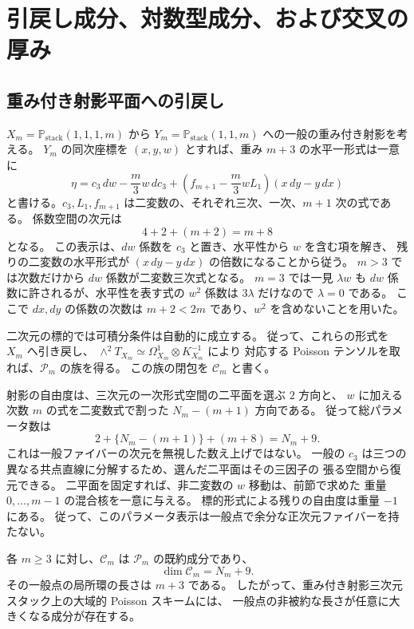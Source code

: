 \section{引戻し成分、対数型成分、および交叉の厚み}
\label{sec:allm-geometry-v33}

\subsection{重み付き射影平面への引戻し}

$X_m=\mathbb P_{\mathrm{stack}}(1,1,1,m)$ から
$Y_m=\mathbb P_{\mathrm{stack}}(1,1,m)$ への一般の重み付き射影を考える。
$Y_m$ の同次座標を $(x,y,w)$ とすれば、重み $m+3$ の水平一形式は一意に
\[
 \eta=c_3\,dw-\frac m3w\,dc_3
       +\left(f_{m+1}-\frac m3wL_1\right)(x\,dy-y\,dx)
\]
と書ける。$c_3,L_1,f_{m+1}$ は二変数の、それぞれ三次、一次、$m+1$ 次の式である。
係数空間の次元は
\[
 4+2+(m+2)=m+8
\]
となる。
この表示は、$dw$ 係数を $c_3$ と置き、水平性から $w$ を含む項を解き、
残りの二変数の水平形式が $(x\,dy-y\,dx)$ の倍数になることから従う。
$m>3$ では次数だけから $dw$ 係数が二変数三次式となる。
$m=3$ では一見 $\lambda w$ も $dw$ 係数に許されるが、水平性を表す式の
$w^2$ 係数は $3\lambda$ だけなので $\lambda=0$ である。
ここで $dx,dy$ の係数の次数は $m+2<2m$ であり、$w^2$ を含めないことを用いた。

二次元の標的では可積分条件は自動的に成立する。
従って、これらの形式を $X_m$ へ引き戻し、
$\wedge^2T_{X_m}\simeq\Omega^1_{X_m}\otimes K_{X_m}^{-1}$ により
対応する Poisson テンソルを取れば、$\mathscr P_m$ の族を得る。
この族の閉包を $\mathscr C_m$ と書く。

射影の自由度は、三次元の一次形式空間の二平面を選ぶ $2$ 方向と、
$w$ に加える次数 $m$ の式を二変数式で割った $N_m-(m+1)$ 方向である。
従って総パラメータ数は
\[
 2+\{N_m-(m+1)\}+(m+8)=N_m+9.
\]
これは一般ファイバーの次元を無視した数え上げではない。
一般の $c_3$ は三つの異なる共点直線に分解するため、選んだ二平面はその三因子の
張る空間から復元できる。
二平面を固定すれば、非二変数の $w$ 移動は、前節で求めた
重量 $0,\ldots,m-1$ の混合核を一意に与える。
標的形式による残りの自由度は重量 $-1$ にある。
従って、このパラメータ表示は一般点で余分な正次元ファイバーを持たない。

\begin{corollary}[任意に大きい一般点の長さを持つ成分]
\label{cor:allm-pullback-component-v33}
各 $m\geq3$ に対し、$\mathscr C_m$ は $\mathscr P_m$ の既約成分であり、
\[
 \dim\mathscr C_m=N_m+9.
\]
その一般点の局所環の長さは $m+3$ である。
したがって、重み付き射影三次元スタック上の大域的 Poisson スキームには、
一般点の非被約な長さが任意に大きくなる成分が存在する。
\end{corollary}

